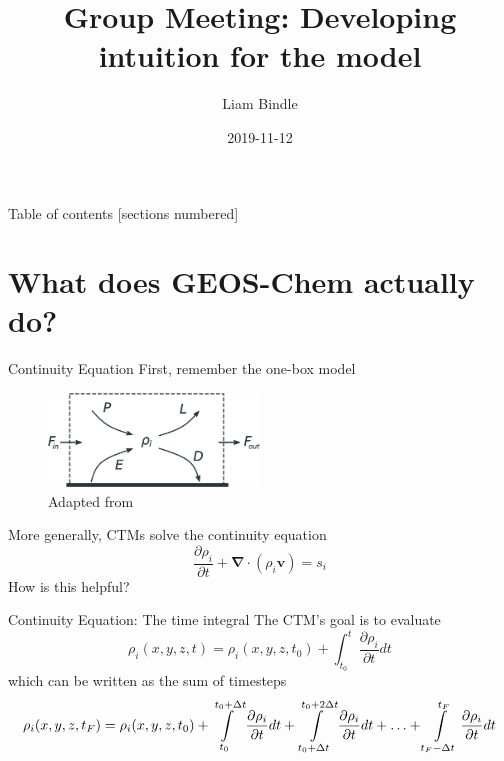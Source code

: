 \documentclass[10pt]{beamer}
\title{Group Meeting: Developing intuition for the model}
\date{2019-11-12}
\author{Liam Bindle}
\begin{document}
\maketitle

\begin{frame}{Table of contents}
  [sections numbered]
  \tableofcontents[hideallsubsections]
\end{frame}

\section{What does GEOS-Chem actually do?}

\begin{frame}[fragile]{Continuity Equation}
    First, remember the one-box model
    \begin{figure}
        \centering
        \includegraphics[width=0.5\textwidth]{box-model.eps}
        \captionsetup{labelformat=empty}
        \caption{Adapted from \cite{jacob_introduction_1999}}
    \end{figure}
    More generally, CTMs solve the continuity equation
    $$
        \frac{\partial \rho_i}{\partial t} + \boldsymbol \nabla \cdot (\rho_i \boldsymbol v) = s_i
    $$
    How is this helpful?
\end{frame}

\begin{frame}[fragile]{Continuity Equation: The time integral}
    The CTM's goal is to evaluate
    $$
        \rho_i(x, y, z, t) = \rho_i(x, y, z, t_0) + \int_{t_0}^{t} \frac{\partial \rho_i}{\partial t} dt
    $$
    \vfill
    which can be written as the sum of timesteps
    \small
    $$
        \rho_i(x, y, z, t_F) = \rho_i(x, y, z, t_0) + \int\displaylimits_{t_0}^{t_0 + \Delta t} \frac{\partial \rho_i}{\partial t} dt  + \int\displaylimits_{t_0 + \Delta t}^{t_0 + 2 \Delta t} \frac{\partial \rho_i}{\partial t} dt + \ldots + \int\displaylimits_{t_F - \Delta t}^{t_F} \frac{\partial \rho_i}{\partial t} dt
    $$
\end{frame}
\end{document}
